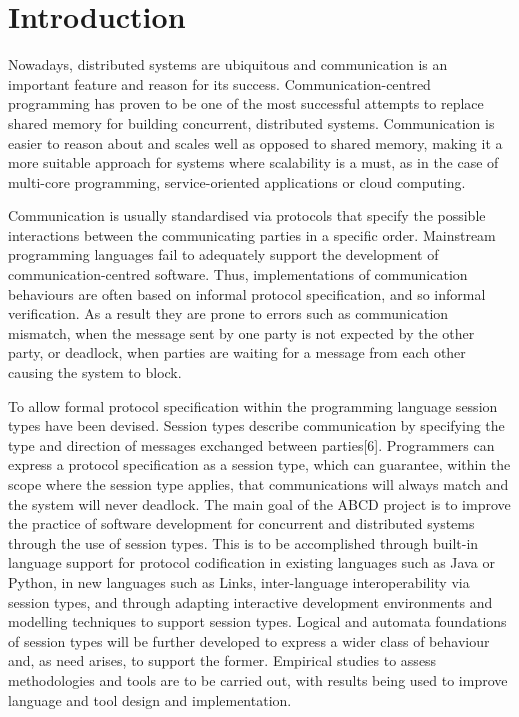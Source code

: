 \section{Introduction}


Nowadays, distributed systems are ubiquitous and communication is an important feature and reason for its success. Communication-centred programming has proven to be one of the most successful attempts to replace shared memory for building concurrent, distributed systems. Communication is easier to reason about and scales well as opposed to shared memory, making it a more suitable approach for systems where scalability is a must, as in the case of multi-core programming, service-oriented applications or cloud computing\cite{abcd}.

Communication is usually standardised via protocols that specify the possible interactions between the communicating parties in a specific order. Mainstream programming languages fail to adequately support the development of communication-centred software. Thus, implementations of communication behaviours are often based on informal protocol specification, and so informal verification. As a result they are prone to errors such as communication mismatch, when the message sent by one party is not expected by the other party, or deadlock, when parties are waiting for a message from each other causing the system to block\cite{abcd}.

To allow formal protocol specification within the programming language session types have been devised. Session types describe communication by specifying the type and direction of messages exchanged between parties[6]. Programmers can express a protocol specification as a session type, which can guarantee, within the scope where the session type applies, that communications will always match and the system will never deadlock.
The main goal of the ABCD project\cite{abcd} is to improve the practice of software development for concurrent and distributed systems through the use of session types. This is to be accomplished through built-in language support for protocol codification in existing languages such as Java or Python, in new languages such as Links\cite{links}, inter-language interoperability via session types, and through adapting interactive development environments and modelling techniques to support session types. Logical and automata foundations of session types will be further developed to express a wider class of behaviour and, as need arises, to support the former. Empirical studies to assess methodologies and tools are to be carried out, with results being used to improve language and tool design and implementation.


